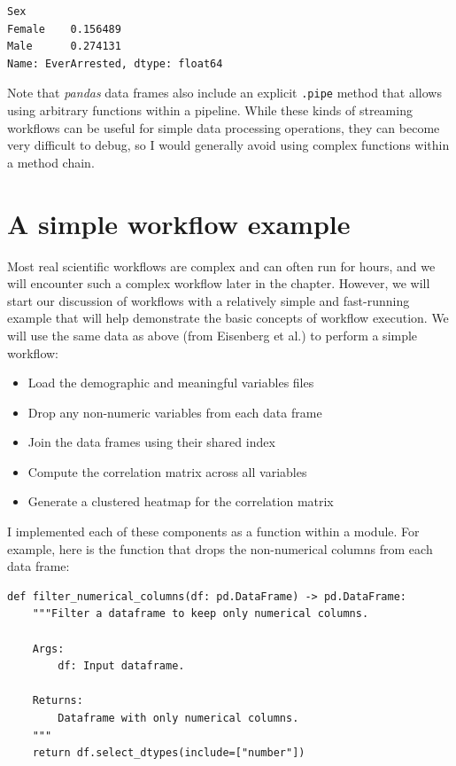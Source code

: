 \begin{lstlisting}[style=replshort]
Sex
Female    0.156489
Male      0.274131
Name: EverArrested, dtype: float64
\end{lstlisting}

Note that \textit{pandas} data frames also include an explicit \texttt{.pipe} method that allows using arbitrary functions within a pipeline. While these kinds of streaming workflows can be useful for simple data processing operations, they can become very difficult to debug, so I would generally avoid using complex functions within a method chain.

\section{A simple workflow example}

Most real scientific workflows are complex and can often run for hours, and we will encounter such a complex workflow later in the chapter. However, we will start our discussion of workflows with a relatively simple and fast-running example that will help demonstrate the basic concepts of workflow execution. We will use the same data as above (from Eisenberg et al.) to perform a simple workflow:

\begin{itemize}
\item Load the demographic and meaningful variables files
\item Drop any non-numeric variables from each data frame
\item Join the data frames using their shared index
\item Compute the correlation matrix across all variables
\item Generate a clustered heatmap for the correlation matrix
\end{itemize}

I implemented each of these components as a function within a module.  For example, here is the function that drops the non-numerical columns from each data frame:

\begin{lstlisting}[style=python]
def filter_numerical_columns(df: pd.DataFrame) -> pd.DataFrame:
    """Filter a dataframe to keep only numerical columns.

    Args:
        df: Input dataframe.

    Returns:
        Dataframe with only numerical columns.
    """
    return df.select_dtypes(include=["number"])

\end{lstlisting}

